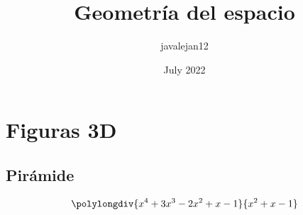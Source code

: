 \documentclass{article}
\title{Geometría del espacio}
\author{javalejan12 }
\date{July 2022}
\begin{document}
\maketitle

\section{Figuras 3D}
\subsection{Pirámide}


$$\polylongdiv{x^4+3x^3-2x^2+x-1}{x^2+x-1}$$
\end{document}
